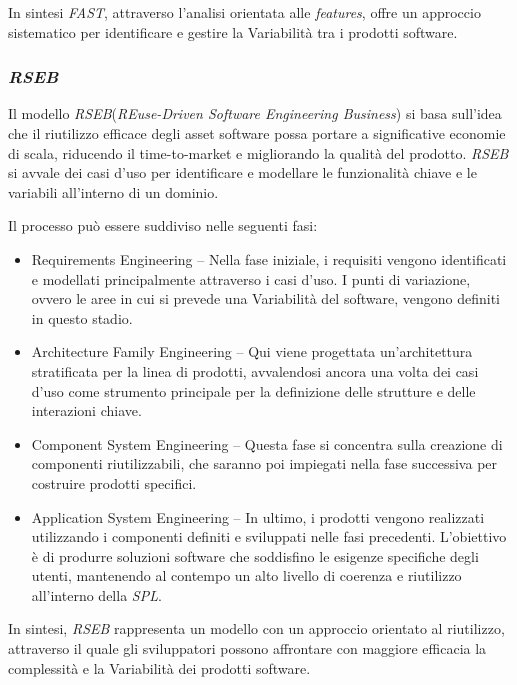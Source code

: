 \documentclass[12pt]{report}
\newcommand{\spl}{\textsl{SPL}\xspace}
\newcommand{\fast}{\textsl{FAST}\xspace}
\newcommand{\rseb}{\textsl{RSEB}\xspace}
\begin{document}
In sintesi \fast, attraverso l'analisi orientata alle \textit{features}, offre un approccio sistematico per identificare e gestire la Variabilità tra i prodotti software.


\subsubsection{\rseb}
Il modello \rseb (\textit{REuse-Driven Software Engineering Business}) \cite{griss:favaro:alessandro} si basa sull'idea che il riutilizzo efficace degli asset software possa portare a significative economie di scala, riducendo il time-to-market e migliorando la qualità del prodotto. \rseb si avvale dei casi d'uso per identificare e modellare le funzionalità chiave e le variabili all'interno di un dominio.

Il processo può essere suddiviso nelle seguenti fasi:

\begin{itemize}
\item \textsf{Requirements Engineering} -- Nella fase iniziale, i requisiti vengono identificati e modellati principalmente attraverso i casi d'uso. I punti di variazione, ovvero le aree in cui si prevede una Variabilità del software, vengono definiti in questo stadio.
\item \textsf{Architecture Family Engineering} -- Qui viene progettata un'architettura stratificata per la linea di prodotti, avvalendosi ancora una volta dei casi d'uso come strumento principale per la definizione delle strutture e delle interazioni chiave.
\item \textsf{Component System Engineering} -- Questa fase si concentra sulla creazione di componenti riutilizzabili, che saranno poi impiegati nella fase successiva per costruire prodotti specifici.
\item \textsf{Application System Engineering} -- In ultimo, i prodotti vengono realizzati utilizzando i componenti definiti e sviluppati nelle fasi precedenti. L'obiettivo è di produrre soluzioni software che soddisfino le esigenze specifiche degli utenti, mantenendo al contempo un alto livello di coerenza e riutilizzo all'interno della \spl.
\end{itemize}

In sintesi, \rseb rappresenta un modello con un approccio orientato al riutilizzo, attraverso il quale gli sviluppatori possono affrontare con maggiore efficacia la complessità e la Variabilità dei prodotti software.
\end{document}
